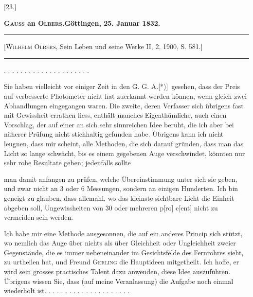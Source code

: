 \clearpage\begingroup
{}
\begin{center}
[23.]\par\medskip
\textbf{\textsc{Gauss} an \textsc{Olbers}.\quad Göttingen, 25. Januar 1832.}\par\medskip
\rule{.78\linewidth}{.4pt}\par\smallskip
{\footnotesize [\textsc{Wilhelm Olbers}, Sein Leben und seine Werke II, 2, 1900, S. 581.]}\par\smallskip
\rule{.78\linewidth}{.4pt}
\end{center}
\noindent . . . . . . . . . . . . . . . . . . . . .\par
\noindent\hspace*{\parindent}Sie haben vielleicht vor einiger Zeit in den G. G. A.[*)]\begingroup\renewcommand{\thefootnote}{}\endgroup\ gesehen, dass der Preis auf verbesserte Photometer nicht hat zuerkannt werden können, wenn gleich zwei Abhandlungen eingegangen waren. Die zweite, deren Verfasser sich übrigens fast mit Gewissheit errathen liess, enthält manches Eigenthümliche, auch einen Vorschlag, der auf einer an sich sehr sinnreichen Idee beruht, die ich aber bei näherer Prüfung nicht stichhaltig gefunden habe. Übrigens kann ich nicht leugnen, dass mir scheint, alle Methoden, die sich darauf gründen, dass man das Licht so lange schwächt, bis es einem gegebenen Auge verschwindet, könnten nur sehr rohe Resultate geben; jedenfalls sollte
\par\clearpage{}
\noindent man damit anfangen zu prüfen, welche Übereinstimmung unter sich sie geben, und zwar nicht an 3 oder 6 Messungen, sondern an einigen Hunderten. Ich bin geneigt zu glauben, dass allemahl, wo das kleinste sichtbare Licht die Einheit abgeben soll, Ungewissheiten von 30 oder mehreren p[ro] c[ent] nicht zu vermeiden sein werden.

Ich habe mir eine Methode ausgesonnen, die auf ein anderes Princip sich stützt, wo nemlich das Auge über nichts als über Gleichheit oder Ungleichheit zweier Gegenstände, die es immer nebeneinander im Gesichtsfelde des Fernrohres sieht, zu urtheilen hat, und Freund \textsc{Gerling} die Hauptideen mitgetheilt. Ich hoffe, er wird sein grosses practisches Talent dazu anwenden, diese Idee auszuführen. Übrigens wissen Sie, dass (auf meine Veranlassung) die Aufgabe noch einmal wiederholt ist. . . . . . . . . . . . . . . . . . . . .

